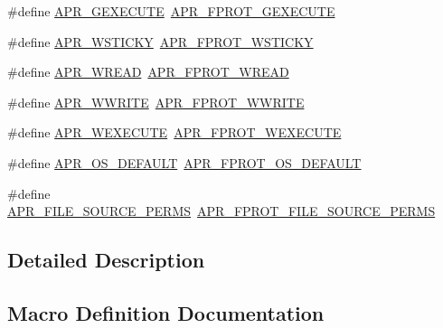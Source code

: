 \begin{DoxyCompactItemize}
\item 
\#define \hyperlink{group__apr__file__permissions_ga79ce615a96a407d6c53325a2f8cdee3d}{A\+P\+R\+\_\+\+G\+E\+X\+E\+C\+U\+TE}~\hyperlink{group__apr__file__permissions_gab627bef3f9ceb84bbf00906eaeb12184}{A\+P\+R\+\_\+\+F\+P\+R\+O\+T\+\_\+\+G\+E\+X\+E\+C\+U\+TE}
\item 
\#define \hyperlink{group__apr__file__permissions_ga824d6685d59e3efddb6ee7fdbee69c13}{A\+P\+R\+\_\+\+W\+S\+T\+I\+C\+KY}~\hyperlink{group__apr__file__permissions_ga989dbea02f779a5f20a643d7e4ee9952}{A\+P\+R\+\_\+\+F\+P\+R\+O\+T\+\_\+\+W\+S\+T\+I\+C\+KY}
\item 
\#define \hyperlink{group__apr__file__permissions_ga5c987d2b1ace95b4ffa7c5a322721aad}{A\+P\+R\+\_\+\+W\+R\+E\+AD}~\hyperlink{group__apr__file__permissions_ga194718630250b0f0dd4be38c86dac717}{A\+P\+R\+\_\+\+F\+P\+R\+O\+T\+\_\+\+W\+R\+E\+AD}
\item 
\#define \hyperlink{group__apr__file__permissions_ga7aac61689e9aaa93176bdb4911f56863}{A\+P\+R\+\_\+\+W\+W\+R\+I\+TE}~\hyperlink{group__apr__file__permissions_ga51692a9828f5b6288d89495378944260}{A\+P\+R\+\_\+\+F\+P\+R\+O\+T\+\_\+\+W\+W\+R\+I\+TE}
\item 
\#define \hyperlink{group__apr__file__permissions_ga7bf4afea195c62f41aad1d3e94dcdac6}{A\+P\+R\+\_\+\+W\+E\+X\+E\+C\+U\+TE}~\hyperlink{group__apr__file__permissions_ga760d69c09b38ddf1e0aff09362d8ce11}{A\+P\+R\+\_\+\+F\+P\+R\+O\+T\+\_\+\+W\+E\+X\+E\+C\+U\+TE}
\item 
\#define \hyperlink{group__apr__file__permissions_ga8552adb50d545d5fc7faeabb4f4a388f}{A\+P\+R\+\_\+\+O\+S\+\_\+\+D\+E\+F\+A\+U\+LT}~\hyperlink{group__apr__file__permissions_gad3c65a67ee6eb12ecc6a33857397900b}{A\+P\+R\+\_\+\+F\+P\+R\+O\+T\+\_\+\+O\+S\+\_\+\+D\+E\+F\+A\+U\+LT}
\item 
\#define \hyperlink{group__apr__file__permissions_gaa72c8bc4ab1bd5615bee4333d23dc16b}{A\+P\+R\+\_\+\+F\+I\+L\+E\+\_\+\+S\+O\+U\+R\+C\+E\+\_\+\+P\+E\+R\+MS}~\hyperlink{group__apr__file__permissions_gac08d4e868c7c9532f7c97c70556663dc}{A\+P\+R\+\_\+\+F\+P\+R\+O\+T\+\_\+\+F\+I\+L\+E\+\_\+\+S\+O\+U\+R\+C\+E\+\_\+\+P\+E\+R\+MS}
\end{DoxyCompactItemize}


\subsection{Detailed Description}


\subsection{Macro Definition Documentation}
